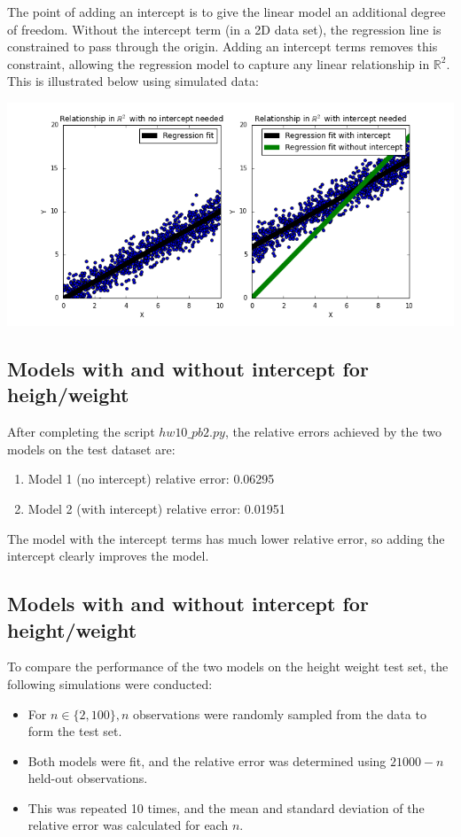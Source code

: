 \documentclass[paper=a4, fontsize=11pt]{scrartcl} %
\numberwithin{equation}{section} %
\numberwithin{figure}{section} %
\numberwithin{table}{section} %
\begin{document}
The point of adding an intercept is to give the linear model an additional degree of freedom. Without the intercept term (in a 2D data set), the regression line is constrained to pass through the origin. Adding an intercept terms removes this constraint, allowing the regression model to capture any linear relationship in $\mathbb{R}^2$. This is illustrated below using simulated data:

\includegraphics[scale = 0.6]{Q3B_fig.png}

\subsection{Models with and without intercept for heigh/weight}

After completing the script $hw10\_pb2.py$, the relative errors achieved by the two models on the test dataset are:

\begin{enumerate}
\item Model 1 (no intercept) relative error: 0.06295
\item Model 2 (with intercept) relative error: 0.01951
\end{enumerate}

The model with the intercept terms has much lower relative error, so adding the intercept clearly improves the model.

\subsection{Models with and without intercept for height/weight}

To compare the performance of the two models on the height weight test set, the following simulations were conducted:
\begin{itemize}
\item For $n \in \{2, 100\}, n$ observations were randomly sampled from the data to form the test set.
\item Both models were fit, and the relative error was determined using  $21000 - n$ held-out observations.
\item This was repeated 10 times, and the mean and standard deviation of the relative error was calculated for each $n$.
\end{itemize}
\end{document}
